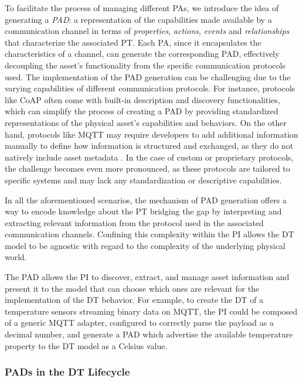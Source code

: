 To facilitate the process of managing different \acp{PA}, we introduce the idea of generating a \emph{\ac{PAD}}: a representation of the capabilities made available by a communication channel in terms of \emph{properties}, \emph{actions}, \emph{events} and \emph{relationships} that characterize the associated \ac{PT}.
%
Each \ac{PA}, since it encapsulates the characteristics of a channel, can generate the corresponding \ac{PAD}, effectively decoupling the asset's functionality from the specific communication protocols used.
%
The implementation of the \ac{PAD} generation can be challenging due to the varying capabilities of different communication protocols.
For instance, protocols like CoAP\cite{RFC7252} often come with built-in description and discovery functionalities, which can simplify the process of creating a \ac{PAD} by providing standardized representations of the physical asset's capabilities and behaviors.
On the other hand, protocols like MQTT may require developers to add additional information manually to define how information is structured and exchanged, as they do not natively include asset metadata \cite{mqtt}.
In the case of custom or proprietary protocols, the challenge becomes even more pronounced, as these protocols are tailored to specific systems and may lack any standardization or descriptive capabilities.

In all the aforementioned scenarios, the mechanism of \ac{PAD} generation offers a way to encode knowledge about the \ac{PT} bridging the gap by interpreting and extracting relevant information from the protocol used in the associated communication channels.
%
Confining this complexity within the \ac{PI} allows the \ac{DT} model to be agnostic with regard to the complexity of the underlying physical world.

The \ac{PAD} allows the \ac{PI} to discover, extract, and manage asset information and present it to the model that can choose which ones are relevant for the implementation of the \ac{DT} behavior.
%
For example, to create the \ac{DT} of a temperature sensors streaming binary data on MQTT, the \ac{PI} could be composed of a generic MQTT adapter, configured to correctly parse the payload as a decimal number, and generate a \ac{PAD} which advertise the available temperature property to the \ac{DT} model as a Celsius value. 

\subsubsection{\aclp{PAD} in the \ac{DT} Lifecycle}

